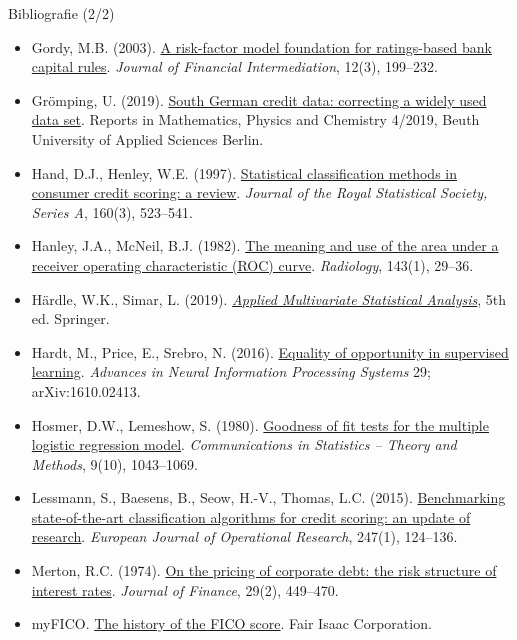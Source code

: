 \begin{frame}{Bibliografie (2/2)}
\itemsize{\tiny}
\begin{itemize}
    \item Gordy, M.B. (2003). \href{https://doi.org/10.1016/S1042-9573(03)00040-8}{A risk-factor model foundation for ratings-based bank capital rules}. \textit{Journal of Financial Intermediation}, 12(3), 199--232.
    \item Grömping, U. (2019). \href{http://www1.beuth-hochschule.de/FB_II/reports/Report-2019-004.pdf}{South German credit data: correcting a widely used data set}. Reports in Mathematics, Physics and Chemistry 4/2019, Beuth University of Applied Sciences Berlin.
    \item Hand, D.J., Henley, W.E. (1997). \href{https://doi.org/10.1111/j.1467-985X.1997.00078.x}{Statistical classification methods in consumer credit scoring: a review}. \textit{Journal of the Royal Statistical Society, Series A}, 160(3), 523--541.
    \item Hanley, J.A., McNeil, B.J. (1982). \href{https://doi.org/10.1148/radiology.143.1.7063747}{The meaning and use of the area under a receiver operating characteristic (ROC) curve}. \textit{Radiology}, 143(1), 29--36.
    \item Härdle, W.K., Simar, L. (2019). \href{https://doi.org/10.1007/978-3-030-26006-4}{\textit{Applied Multivariate Statistical Analysis}}, 5th ed. Springer.
    \item Hardt, M., Price, E., Srebro, N. (2016). \href{https://arxiv.org/abs/1610.02413}{Equality of opportunity in supervised learning}. \textit{Advances in Neural Information Processing Systems} 29; arXiv:1610.02413.
    \item Hosmer, D.W., Lemeshow, S. (1980). \href{https://doi.org/10.1080/03610928008827941}{Goodness of fit tests for the multiple logistic regression model}. \textit{Communications in Statistics -- Theory and Methods}, 9(10), 1043--1069.
    \item Lessmann, S., Baesens, B., Seow, H.-V., Thomas, L.C. (2015). \href{https://doi.org/10.1016/j.ejor.2015.05.030}{Benchmarking state-of-the-art classification algorithms for credit scoring: an update of research}. \textit{European Journal of Operational Research}, 247(1), 124--136.
    \item Merton, R.C. (1974). \href{https://doi.org/10.1111/j.1540-6261.1974.tb03058.x}{On the pricing of corporate debt: the risk structure of interest rates}. \textit{Journal of Finance}, 29(2), 449--470.
    \item myFICO. \href{https://www.myfico.com/credit-education/blog/history-of-the-fico-score}{The history of the FICO score}. Fair Isaac Corporation.

\end{itemize}
\end{frame}
